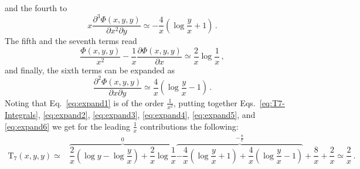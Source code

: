 \documentclass[10pt]{report}
\newcommand{\ro}[1]{\textrm{#1}}
\renewcommand{\(}{\left(}
\renewcommand{\)}{\right)}
\renewcommand{\[}{\left[}
\renewcommand{\]}{\right]}
\newcommand{\del}{\partial}
\begin{document}
and the fourth to
\begin{equation}
    x \dfrac{\del^3 \Phi(x,y,y)}{\del x^2 \del y} \simeq -\dfrac{4}{x}\(\log \dfrac{y}{x} + 1 \)\,.
    \label{eq:expand4}
\end{equation}
The fifth and the seventh terms read
\begin{equation}
    \dfrac{\Phi(x,y,y)}{x^2}
    -\dfrac{1}{x} \dfrac{\del \Phi(x,y,y)}{\del x} \simeq \dfrac{2}{x} \log \dfrac{1}{x} \,,
    \label{eq:expand5}
\end{equation}
and finally, the sixth terms can be expanded as
\begin{equation}
    \dfrac{\del^2 \Phi(x,y,y)}{\del x \del y} \simeq \dfrac{4}{x}\(\log \dfrac{y}{x} -1\)\,.
    \label{eq:expand6}
\end{equation}
Noting that Eq.~\eqref{eq:expand1} is of the order $\tfrac{1}{x^2}$, putting together Eqs.~\eqref{eq:T7-Integrals}, \eqref{eq:expand2}, \eqref{eq:expand3}, \eqref{eq:expand4}, \eqref{eq:expand5}, and \eqref{eq:expand6} we get for the leading $\tfrac{1}{x}$ contributions the following:
\begin{equation}
    \begin{aligned}
    \ro{T}_7\(x,y,y\) \simeq& \overbrace{\dfrac{2}{x} \( \log y - \log \dfrac{y}{x} \) + \dfrac{2}{x} \log \dfrac{1}{x}}^{0} \overbrace{-\dfrac{4}{x}\(\log \dfrac{y}{x} + 1 \) +
    \dfrac{4}{x}\(\log \dfrac{y}{x} -1\)}^{-\tfrac{8}{x}} + \dfrac{8}{x} + \dfrac{2}{x} \simeq \dfrac{2}{x}\,.
    \end{aligned}
    \label{eq:T7-expanded}
\end{equation}

\newpage



\end{document}
